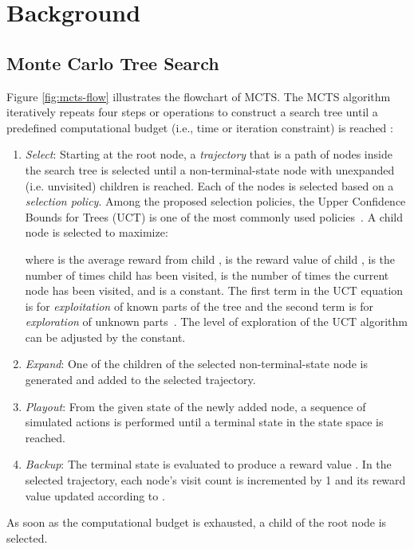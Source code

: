 \documentclass[10pt, conference, compsocconf]{IEEEtran}
\begin{document}
\section{Background}
\label{sec:back}
\subsection{Monte Carlo Tree Search}
Figure \ref{fig:mcts-flow} illustrates the flowchart of MCTS. The MCTS algorithm iteratively repeats four steps or operations to construct a search tree until a predefined computational budget  (i.e., time or iteration constraint) is reached : 
\begin{enumerate}
\item \textit{Select}: Starting at the root node, a \textit{trajectory} that is a path of nodes inside the search tree is selected until a non-terminal-state node with unexpanded (i.e. unvisited) children is reached. Each of the nodes is selected based on a \textit{selection policy}. Among the proposed selection policies, the Upper Confidence Bounds for Trees (UCT) is one of the most commonly used policies~\cite{Kocsis2006,Browne2012}. A child node  is selected to maximize: 

where  is the average reward from child ,  is the reward value
of child ,  is the number of times child  has
been visited,  is the number of times the current node has been
visited, and  is a constant. The first term in the UCT
equation is for \textit{exploitation} of known parts of the tree and the second term is for
\textit{exploration} of unknown parts~\cite{Browne2012}. The level of exploration of the UCT
algorithm can be adjusted by the  constant.



 
\item \textit{Expand}: One of the children of the selected non-terminal-state node is generated and added to the selected trajectory.
\item \textit{Playout}: From the given state of the newly added node, a sequence of simulated actions is performed until a terminal state in the state space is reached.
\item \textit{Backup}: The terminal state is evaluated to produce a reward value . In the selected trajectory, each node's visit count  is incremented by 1 and its reward value  updated according to  \cite{Browne2012}.
\end{enumerate}
As soon as the computational budget  is exhausted, a child of the root node is selected.
\end{document}

